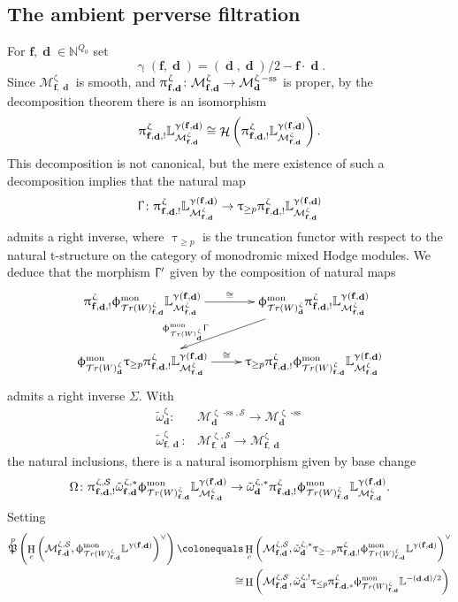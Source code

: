 \documentclass[a4paper,10pt]{amsart}
\renewcommand{\gamma}{\upgamma}
\renewcommand{\zeta}{\upzeta}
\renewcommand{\pi}{\uppi\hspace{0.05em}}
\renewcommand{\Gamma}{\Upgamma}
\renewcommand{\phi}{\upphi}
\renewcommand{\tau}{\uptau}
\DeclareMathOperator{\Pf}{\mathfrak{P}}
\newcommand{\ff}{\mathbf{f}}
\newcommand{\LL}{\mathbb{L}}
\newcommand{\NN}{\mathbb{N}}
\newcommand{\SP}{\mathcal{S}}
\newcommand{\WW}{\mathcal{T}r(W)}
\newcommand{\Msp}{\mathcal{M}}
\newcommand{\phim}[1]{\phi^{\mon}_{#1}}
\DeclareMathOperator{\sst}{-ss}
\DeclareMathOperator{\mon}{mon}
\DeclareMathOperator{\dd}{\mathbf{d}}
\DeclareMathOperator{\Ho}{\mathcal{H}}
\DeclareMathOperator{\HO}{H}
\begin{document}
\subsection{The ambient perverse filtration}
\label{PervSec}
For $\ff,\dd\in \NN^{Q_0}$ set 
\[
\gamma(\ff,\dd)=(\dd,\dd)/2-\ff\cdot\dd.
\]
Since $\Msp_{\ff,\dd }^{\zeta}$ is smooth, and $\pi^{\zeta}_{\ff,\dd }\colon \Msp_{\ff,\dd }^{\zeta}\rightarrow \Msp_{\dd}^{\zeta\sst}$ is proper, by the decomposition theorem there is an isomorphism
\[
\pi ^{\zeta}_{\ff,\dd ,!}\LL^{\gamma(\ff,\dd)}_{\Msp_{\ff,\dd}^{\zeta}}\cong\Ho\left(\pi ^{\zeta}_{\ff,\dd ,!}\LL^{\gamma(\ff,\dd)}_{\Msp_{\ff,\dd }^{\zeta}}\right).
\]
This decomposition is not canonical, but the mere existence of such a decomposition implies that the natural map 
\[
\Gamma\colon \pi ^{\zeta}_{\ff,\dd ,!}\LL^{\gamma(\ff,\dd)}_{\Msp_{\ff,\dd }^{\zeta}}\rightarrow \tau_{\geq p}\pi ^{\zeta}_{\ff,\dd ,!}\LL^{\gamma(\ff,\dd)}_{\Msp_{\ff,\dd }^{\zeta}}
\]
admits a right inverse, where $\tau_{\geq p}$ is the truncation functor with respect to the natural t-structure on the category of monodromic mixed Hodge modules.  We deduce that the morphism $\Gamma'$ given by the composition of natural maps
\[
\xymatrix{
\pi ^{\zeta}_{\ff,\dd ,!}\phim{\WW_{\ff,\dd}^{\zeta}}\LL^{\gamma(\ff,\dd)}_{\Msp_{\ff,\dd }^{\zeta}}\ar[r]^-{\cong}&\phim{\WW_{\dd}^{\zeta}}\pi ^{\zeta}_{\ff,\dd ,!}\LL^{\gamma(\ff,\dd)}_{\Msp_{\ff,\dd }^{\zeta}}\ar[dl]_>>>>>{\phim{\WW_{\dd}^{\zeta}}\Gamma}\\
\phim{\WW_{\dd}^{\zeta}}\tau_{\geq p}\pi ^{\zeta}_{\ff,\dd ,!}\LL^{\gamma(\ff,\dd)}_{\Msp_{\ff,\dd }^{\zeta}}\ar[r]^-{\cong}&\tau_{\geq p}\pi ^{\zeta}_{\ff,\dd ,!}\phim{\WW_{\ff,\dd}^{\zeta}}\LL^{\gamma(\ff,\dd)}_{\Msp_{\ff,\dd }^{\zeta}}
}
\]
admits a right inverse $\Sigma$.  With 
\begin{align*}
\tilde{\omega}^{\zeta}_{\dd}\colon &\Msp^{\zeta\sst,\SP}_{\dd}\rightarrow \Msp^{\zeta\sst}_{\dd}\\
\tilde{\omega}^{\zeta}_{\ff,\dd}\colon &\Msp^{\zeta,\SP}_{\ff,\dd}\rightarrow \Msp^{\zeta}_{\ff,\dd}
\end{align*}
the natural inclusions, there is a natural isomorphism given by base change
\[
\Omega\colon \pi^{\zeta,\SP}_{\ff,\dd,!}\tilde{\omega}^{\zeta,*}_{\ff,\dd}\phim{\WW_{\ff,\dd}^{\zeta}}\LL^{\gamma(\ff,\dd)}_{\Msp_{\ff,\dd }^{\zeta}}\rightarrow  \tilde{\omega}^{\zeta,*}_{\dd}\pi ^{\zeta}_{\ff,\dd ,!}\phim{\WW_{\ff,\dd}^{\zeta}}\LL^{\gamma(\ff,\dd)}_{\Msp_{\ff,\dd }^{\zeta}}.
\]
Setting 
\begin{align*}
\Pf^p\left(\HO_c\left(\Msp^{\zeta,\SP}_{\ff,\dd},\phim{\WW^{\zeta}_{\ff,\dd}}\LL^{\gamma(\ff,\dd)}\right)^{\vee}\right)\colonequals &\HO_c\left(\Msp^{\zeta,\SP}_{\ff,\dd},\tilde{\omega}^{\zeta,*}_{\dd}\tau_{\geq {}-p}\pi_{\ff,\dd,!}^{\zeta}\phim{\WW^{\zeta}_{\ff,\dd}}\LL^{\gamma(\ff,\dd)}\right)^{\vee}\\
\cong&\HO\left(\Msp^{\zeta,\SP}_{\ff,\dd},\tilde{\omega}^{\zeta,!}_{\dd}\tau_{\leq p}\pi_{\ff,\dd,*}^{\zeta}\phim{\WW^{\zeta}_{\ff,\dd}}\LL^{-(\dd,\dd)/2}\right)
\end{align*}
\end{document}

